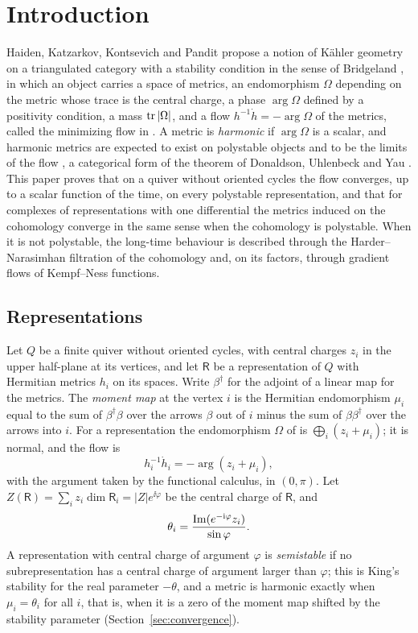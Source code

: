 \section{Introduction}\label{sec:intro}

Haiden, Katzarkov, Kontsevich and Pandit \cite{hkkp26} propose a notion of
K\"ahler geometry on a triangulated category with a stability condition in
the sense of Bridgeland \cite{bri07}, in which an object carries a space of
metrics, an endomorphism $\Omega$ depending on the metric whose trace is the
central charge, a phase $\arg\Omega$ defined by a positivity condition, a
mass $\operatorname{tr}|\Omega|$, and a flow $h^{-1}\dot h=-\arg\Omega$ of the metrics,
called the minimizing flow in \cite[\S4.1]{hkkp26}. A metric is
\emph{harmonic} if $\arg\Omega$ is a scalar, and harmonic metrics are
expected to exist on polystable objects and to be the limits of the flow
\cite[\S\S1,~4.1]{hkkp26}, a categorical form of the theorem of Donaldson,
Uhlenbeck and Yau \cite{don85,uy86}. This paper proves that on a quiver
without oriented cycles the flow converges, up to a scalar function of the
time, on every polystable representation, and that for complexes of
representations with one differential the metrics induced on the cohomology
converge in the same sense when the cohomology is polystable. When it is not
polystable, the long-time behaviour is described through the
Harder--Narasimhan filtration of the cohomology and, on its factors, through
gradient flows of Kempf--Ness functions.

\subsection{Representations}
Let $Q$ be a finite quiver without oriented cycles, with central charges
$z_i$ in the upper half-plane at its vertices, and let $\mathsf R$ be a
representation of $Q$ with Hermitian metrics $h_i$ on its spaces. Write
$\beta^\dagger$ for the adjoint of a linear map for the metrics. The
\emph{moment map} at the vertex $i$ is the Hermitian endomorphism $\mu_i$
equal to the sum of $\beta^\dagger\beta$ over the arrows $\beta$ out of $i$
minus the sum of $\beta\beta^\dagger$ over the arrows into $i$. For a
representation the endomorphism $\Omega$ of \cite[\S5.1]{hkkp26} is
$\bigoplus_i(z_i+\mu_i)$; it is normal, and the flow is
\[
 h_i^{-1}\dot h_i=-\arg(z_i+\mu_i),
\]
with the argument taken by the functional calculus, in $(0,\pi)$. Let
$Z(\mathsf R)=\sum_iz_i\dim\mathsf R_i=|Z|e^{\ii\varphi}$ be the central
charge of $\mathsf R$, and
\[
 \theta_i=\frac{\operatorname{Im}(e^{-\mathrm i\varphi}z_i)}{\sin\varphi}.
\]
A representation with central charge of argument $\varphi$ is
\emph{semistable} if no subrepresentation has a central charge of argument
larger than $\varphi$; this is King's stability \cite{kin94} for the real
parameter $-\theta$, and a metric is harmonic exactly when
$\mu_i=\theta_i$ for all $i$, that is, when it is a zero of the moment map
shifted by the stability parameter (Section~\ref{sec:convergence}).

